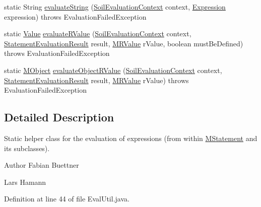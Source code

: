 \begin{DoxyCompactItemize}
\item 
static String \hyperlink{classorg_1_1tzi_1_1use_1_1uml_1_1sys_1_1soil_1_1_eval_util_af1ec72b63bc2134078714631f0e14e35}{evaluate\-String} (\hyperlink{classorg_1_1tzi_1_1use_1_1uml_1_1sys_1_1soil_1_1_soil_evaluation_context}{Soil\-Evaluation\-Context} context, \hyperlink{classorg_1_1tzi_1_1use_1_1uml_1_1ocl_1_1expr_1_1_expression}{Expression} expression)  throws Evaluation\-Failed\-Exception 
\item 
static \hyperlink{classorg_1_1tzi_1_1use_1_1uml_1_1ocl_1_1value_1_1_value}{Value} \hyperlink{classorg_1_1tzi_1_1use_1_1uml_1_1sys_1_1soil_1_1_eval_util_a98471cef7c4712430840349f533a85f2}{evaluate\-R\-Value} (\hyperlink{classorg_1_1tzi_1_1use_1_1uml_1_1sys_1_1soil_1_1_soil_evaluation_context}{Soil\-Evaluation\-Context} context, \hyperlink{classorg_1_1tzi_1_1use_1_1uml_1_1sys_1_1_statement_evaluation_result}{Statement\-Evaluation\-Result} result, \hyperlink{classorg_1_1tzi_1_1use_1_1uml_1_1sys_1_1soil_1_1_m_r_value}{M\-R\-Value} r\-Value, boolean must\-Be\-Defined)  throws Evaluation\-Failed\-Exception 
\item 
static \hyperlink{interfaceorg_1_1tzi_1_1use_1_1uml_1_1sys_1_1_m_object}{M\-Object} \hyperlink{classorg_1_1tzi_1_1use_1_1uml_1_1sys_1_1soil_1_1_eval_util_a43364eb0c91cf5331b0fdadc94bb399d}{evaluate\-Object\-R\-Value} (\hyperlink{classorg_1_1tzi_1_1use_1_1uml_1_1sys_1_1soil_1_1_soil_evaluation_context}{Soil\-Evaluation\-Context} context, \hyperlink{classorg_1_1tzi_1_1use_1_1uml_1_1sys_1_1_statement_evaluation_result}{Statement\-Evaluation\-Result} result, \hyperlink{classorg_1_1tzi_1_1use_1_1uml_1_1sys_1_1soil_1_1_m_r_value}{M\-R\-Value} r\-Value)  throws Evaluation\-Failed\-Exception 
\end{DoxyCompactItemize}


\subsection{Detailed Description}
Static helper class for the evaluation of expressions (from within \hyperlink{classorg_1_1tzi_1_1use_1_1uml_1_1sys_1_1soil_1_1_m_statement}{M\-Statement} and its subclasses). \begin{DoxyAuthor}{Author}
Fabian Buettner 

Lars Hamann 
\end{DoxyAuthor}


Definition at line 44 of file Eval\-Util.\-java.



